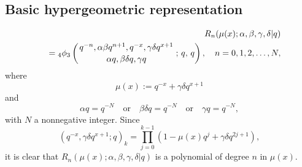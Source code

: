\documentclass[envcountchap,graybox]{svmono}
\newcommand{\qhyp}[5]{\mbox{}_{#1}{\phi}_{#2}
\left(\genfrac{}{}{0pt}{}{#3}{#4}\,;\,q,\,#5\right)}
\newcommand{\qhyp}[5]{\,\mbox{}_{#1}\phi_{#2}\!\left(
  \genfrac{}{}{0pt}{}{#3}{#4};#5\right)}
\begin{document}
\subsection*{Basic hypergeometric representation}
\begin{eqnarray}
\label{DefqRacah}
& &R_n(\mu(x);\alpha,\beta,\gamma,\delta|q)\nonumber\\
& &{}=\qhyp{4}{3}{q^{-n},\alpha\beta q^{n+1},q^{-x},\gamma\delta q^{x+1}}{\alpha q,\beta\delta q,\gamma q}{q},
\quad n=0,1,2,\ldots,N,
\end{eqnarray}
where
$$\mu(x):=q^{-x}+\gamma\delta q^{x+1}$$
and
$$\alpha q=q^{-N}\quad\textrm{or}\quad\beta\delta q=q^{-N}\quad\textrm{or}\quad\gamma q=q^{-N},$$
with $N$ a nonnegative integer.
Since
$$(q^{-x},\gamma\delta q^{x+1};q)_k=\prod_{j=0}^{k-1}\left(1-\mu(x)q^j+\gamma\delta q^{2j+1}\right),$$
it is clear that $R_n(\mu(x);\alpha,\beta,\gamma,\delta|q)$ is a polynomial of degree $n$ in $\mu(x)$.
\end{document}

